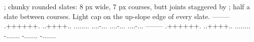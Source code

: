 ; chunky rounded slates: 8 px wide, 7 px courses, butt joints staggered by
; half a slate between courses. Light cap on the up-slope edge of every slate.
--------
.++++++.
..++++..
........
....-...
....-...
....-...
--------
.++++++.
..++++..
........
-.......
-.......
-.......
